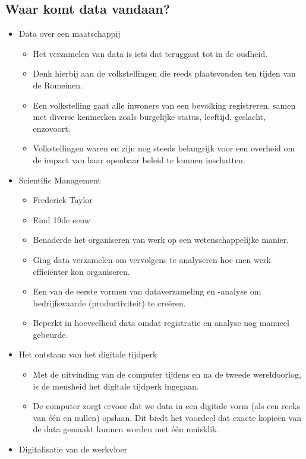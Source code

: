 \documentclass[]{tufte-book}
\providecommand{\tightlist}{%
  \setlength{\itemsep}{0pt}\setlength{\parskip}{0pt}}
\begin{document}
\hypertarget{waar-komt-data-vandaan}{%
\subsection{Waar komt data vandaan?}\label{waar-komt-data-vandaan}}

\begin{itemize}
\tightlist
\item
  Data over een maatschappij

  \begin{itemize}
  \tightlist
  \item
    Het verzamelen van data is iets dat teruggaat tot in de oudheid.
  \item
    Denk hierbij aan de volkstellingen die reeds plaatsvonden ten tijden van de Romeinen.
  \item
    Een volkstelling gaat alle inwoners van een bevolking registreren, samen met diverse kenmerken zoals burgelijke status, leeftijd, geslacht, enzovoort.
  \item
    Volkstellingen waren en zijn nog steeds belangrijk voor een overheid om de impact van haar openbaar beleid te kunnen inschatten.
  \end{itemize}
\item
  Scientific Management

  \begin{itemize}
  \tightlist
  \item
    Frederick Taylor
  \item
    Eind 19de eeuw
  \item
    Benaderde het organiseren van werk op een wetenschappelijke manier.
  \item
    Ging data verzamelen om vervolgens te analyseren hoe men werk efficiënter kon organiseren.
  \item
    Een van de eerste vormen van dataverzameling en -analyse om bedrijfswaarde (productiviteit) te creëren.
  \item
    Beperkt in hoeveelheid data omdat registratie en analyse nog manueel gebeurde.
  \end{itemize}
\item
  Het ontstaan van het digitale tijdperk

  \begin{itemize}
  \tightlist
  \item
    Met de uitvinding van de computer tijdens en na de tweede wereldoorlog, is de mensheid het digitale tijdperk ingegaan.
  \item
    De computer zorgt ervoor dat we data in een digitale vorm (als een reeks van één en nullen) opslaan. Dit biedt het voordeel dat exacte kopieën van de data gemaakt kunnen worden met één muisklik.
  \end{itemize}
\item
  Digitalisatie van de werkvloer


\end{itemize}
\end{document}
